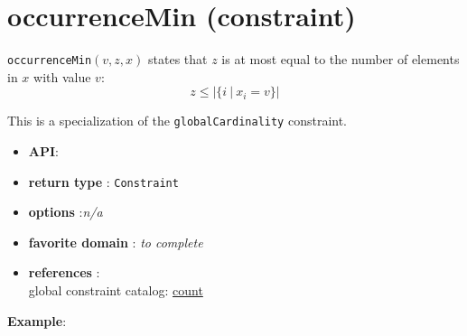 \label{occurrencemin}
\hypertarget{occurrencemin}{}

\section{occurrenceMin (constraint)}\label{occurrencemin:occurrenceminconstraint}\hypertarget{occurrencemin:occurrenceminconstraint}{}
\begin{notedef}
  \texttt{occurrenceMin}$(v,z,x)$ states that $z$ is at most equal to the number of elements in $x$ with value $v$:
$$z\le|\{i\ |\ x_i=v\}|$$   
\end{notedef}
  This is a specialization of the \texttt{globalCardinality} constraint.

\begin{itemize}
	\item \textbf{API}: 
	\item \textbf{return type} : \texttt{Constraint}
	\item \textbf{options} :\emph{n/a}
	\item \textbf{favorite domain} : \emph{to complete}
	\item \textbf{references} :\\
      global constraint catalog: \href{http://www.emn.fr/x-info/sdemasse/gccat/Ccount.html}{count}
\end{itemize}

\textbf{Example}:
